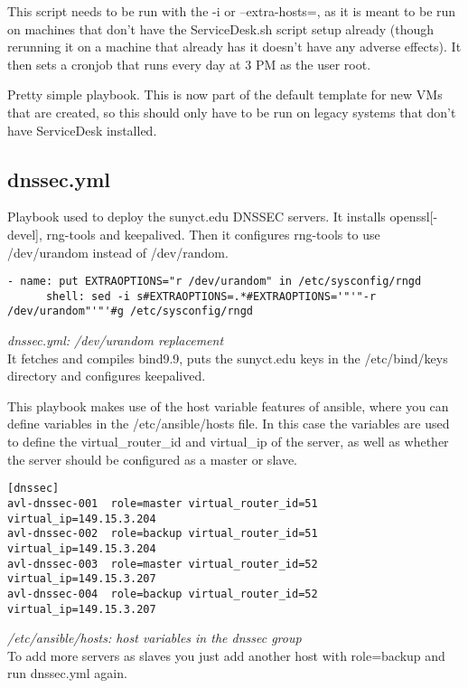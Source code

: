 \documentclass[a4paper]{article}
\begin{document}
This script needs to be run with the -i or --extra-hosts=, as it is meant to be run on machines that don't have the ServiceDesk.sh script setup already (though rerunning it on a machine that already has it doesn't have any adverse effects). It then sets a cronjob that runs every day at 3 PM as the user root.

Pretty simple playbook. This is now part of the default template for new VMs that are created, so this should only have to be run on legacy systems that don't have ServiceDesk installed.

\subsection{dnssec.yml}
Playbook used to deploy the sunyct.edu DNSSEC servers. It installs openssl[-devel], rng-tools and keepalived. Then it configures rng-tools to use /dev/urandom instead of /dev/random.

\begin{lstlisting}[language=nagconf]
    - name: put EXTRAOPTIONS="r /dev/urandom" in /etc/sysconfig/rngd
      shell: sed -i s#EXTRAOPTIONS=.*#EXTRAOPTIONS='"'"-r /dev/urandom"'"'#g /etc/sysconfig/rngd
\end{lstlisting}
\hfill \textit{dnssec.yml: /dev/urandom replacement}\\

It fetches and compiles bind9.9, puts the sunyct.edu keys in the /etc/bind/keys directory and configures keepalived.

This playbook makes use of the host variable features of ansible, where you can define variables in the /etc/ansible/hosts file. In this case the variables are used to define the virtual\_router\_id and virtual\_ip of the server, as well as whether the server should be configured as a master or slave.

\begin{lstlisting}[language=nagconf]
[dnssec]
avl-dnssec-001	role=master virtual_router_id=51 virtual_ip=149.15.3.204
avl-dnssec-002  role=backup virtual_router_id=51 virtual_ip=149.15.3.204
avl-dnssec-003	role=master virtual_router_id=52 virtual_ip=149.15.3.207
avl-dnssec-004  role=backup virtual_router_id=52 virtual_ip=149.15.3.207
\end{lstlisting}
\hfill \textit{/etc/ansible/hosts: host variables in the dnssec group}\\

To add more servers as slaves you just add another host with role=backup and run dnssec.yml again.
\end{document}
